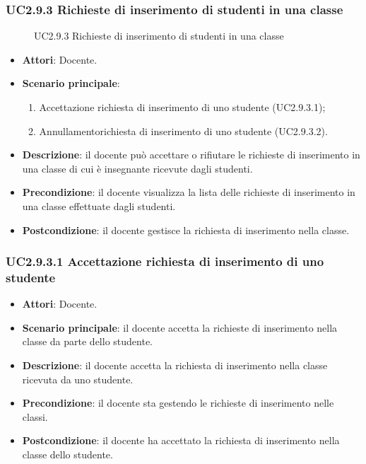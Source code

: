 \subsubsection{UC2.9.3 Richieste di inserimento di studenti in una classe}
\begin{figure}[H]
\centering
\noindent{}
\caption{UC2.9.3 Richieste di inserimento di studenti in una classe}
\end{figure}
\begin{itemize}
\item \textbf{Attori}: Docente.
\item \textbf{Scenario principale}:
\begin{enumerate}
\item Accettazione richiesta di inserimento di uno studente (UC2.9.3.1);
\item Annullamentorichiesta di inserimento di uno studente (UC2.9.3.2).
\end{enumerate}
\item \textbf{Descrizione}: il docente può accettare o rifiutare le richieste di inserimento in una classe di cui è insegnante ricevute dagli studenti.
\item \textbf{Precondizione}: il docente visualizza la lista delle richieste di inserimento in una classe effettuate dagli studenti.
\item \textbf{Postcondizione}: il docente gestisce la richiesta di inserimento nella classe.
\end{itemize}
\subsubsection{UC2.9.3.1 Accettazione richiesta di inserimento di uno studente}
\begin{itemize}
\item \textbf{Attori}: Docente.
\item \textbf{Scenario principale}: il docente accetta la richieste di inserimento nella classe da parte dello studente.
\item \textbf{Descrizione}: il docente accetta la richiesta di inserimento nella classe ricevuta da uno studente.
\item \textbf{Precondizione}: il docente sta gestendo le richieste di inserimento nelle classi.
\item \textbf{Postcondizione}: il docente ha accettato la richiesta di inserimento nella classe dello studente.
\end{itemize}
